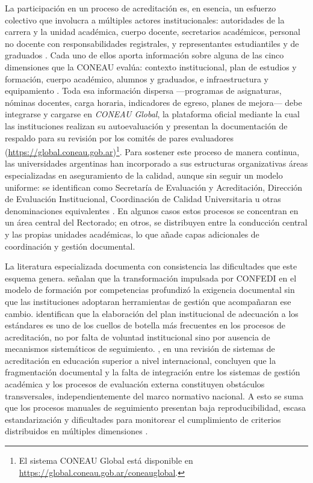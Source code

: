 La participación en un proceso de acreditación es, en esencia, un esfuerzo colectivo que involucra a múltiples actores institucionales: autoridades de la carrera y la unidad académica, cuerpo docente, secretarios académicos, personal no docente con responsabilidades registrales, y representantes estudiantiles y de graduados \citep{sanabria2023procesos, greiner2023plan}. Cada uno de ellos aporta información sobre alguna de las cinco dimensiones que la CONEAU evalúa: contexto institucional, plan de estudios y formación, cuerpo académico, alumnos y graduados, e infraestructura y equipamiento \citep{coneau2017procedimientos}. Toda esa información dispersa ---programas de asignaturas, nóminas docentes, carga horaria, indicadores de egreso, planes de mejora--- debe integrarse y cargarse en \textit{CONEAU Global}, la plataforma oficial mediante la cual las instituciones realizan su autoevaluación y presentan la documentación de respaldo para su revisión por los comités de pares evaluadores (\url{https://global.coneau.gob.ar})\footnote{El sistema CONEAU Global está disponible en \url{https://global.coneau.gob.ar/coneauglobal}.}. Para sostener este proceso de manera continua, las universidades argentinas han incorporado a sus estructuras organizativas áreas especializadas en aseguramiento de la calidad, aunque sin seguir un modelo uniforme: se identifican como Secretaría de Evaluación y Acreditación, Dirección de Evaluación Institucional, Coordinación de Calidad Universitaria u otras denominaciones equivalentes \citep{marquina2022implicancias}. En algunos casos estos procesos se concentran en un área central del Rectorado; en otros, se distribuyen entre la conducción central y las propias unidades académicas, lo que añade capas adicionales de coordinación y gestión documental.

La literatura especializada documenta con consistencia las dificultades que este esquema genera. \citet{sanchez2022acreditacion} señalan que la transformación impulsada por CONFEDI en el modelo de formación por competencias profundizó la exigencia documental sin que las instituciones adoptaran herramientas de gestión que acompañaran ese cambio. \citet{greiner2023plan} identifican que la elaboración del plan institucional de adecuación a los estándares es uno de los cuellos de botella más frecuentes en los procesos de acreditación, no por falta de voluntad institucional sino por ausencia de mecanismos sistemáticos de seguimiento. \citet{duarte2023literature}, en una revisión de sistemas de acreditación en educación superior a nivel internacional, concluyen que la fragmentación documental y la falta de integración entre los sistemas de gestión académica y los procesos de evaluación externa constituyen obstáculos transversales, independientemente del marco normativo nacional. A esto se suma que los procesos manuales de seguimiento presentan baja reproducibilidad, escasa estandarización y dificultades para monitorear el cumplimiento de criterios distribuidos en múltiples dimensiones \citep{tortosasistemas, casadiego2025acreditacion}.

